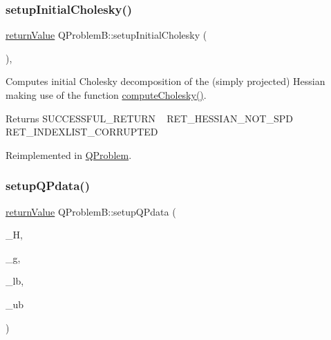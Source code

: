 \subsubsection{\texorpdfstring{setup\+Initial\+Cholesky()}{setupInitialCholesky()}}
{\footnotesize\ttfamily \hyperlink{_message_handling_8hpp_a81d556f613bfbabd0b1f9488c0fa865e}{return\+Value} Q\+Problem\+B\+::setup\+Initial\+Cholesky (\begin{DoxyParamCaption}{ }\end{DoxyParamCaption})\hspace{0.3cm}{\ttfamily [protected]}, {\ttfamily [virtual]}}

Computes initial Cholesky decomposition of the (simply projected) Hessian making use of the function \hyperlink{class_q_problem_b_a5f9fa59b80f990a897ba783e89dd03d3}{compute\+Cholesky()}. \begin{DoxyReturn}{Returns}
S\+U\+C\+C\+E\+S\+S\+F\+U\+L\+\_\+\+R\+E\+T\+U\+RN ~\newline
 R\+E\+T\+\_\+\+H\+E\+S\+S\+I\+A\+N\+\_\+\+N\+O\+T\+\_\+\+S\+PD ~\newline
 R\+E\+T\+\_\+\+I\+N\+D\+E\+X\+L\+I\+S\+T\+\_\+\+C\+O\+R\+R\+U\+P\+T\+ED 
\end{DoxyReturn}


Reimplemented in \hyperlink{class_q_problem_acb3d279975d00e5e459af3a7bb056658}{Q\+Problem}.

\mbox{\label{class_q_problem_b_ab785215eb0f10994203a19632b715212}} 
\subsubsection{\texorpdfstring{setup\+Q\+Pdata()}{setupQPdata()}\hspace{0.1cm}{\footnotesize\ttfamily [1/2]}}
{\footnotesize\ttfamily \hyperlink{_message_handling_8hpp_a81d556f613bfbabd0b1f9488c0fa865e}{return\+Value} Q\+Problem\+B\+::setup\+Q\+Pdata (\begin{DoxyParamCaption}\item[{\hyperlink{class_symmetric_matrix}{Symmetric\+Matrix} $\ast$}]{\+\_\+H,  }\item[{const \hyperlink{qp_o_a_s_e_s__wrapper_8h_a0d00e2b3dfadee81331bbb39068570c4}{real\+\_\+t} $\ast$const}]{\+\_\+g,  }\item[{const \hyperlink{qp_o_a_s_e_s__wrapper_8h_a0d00e2b3dfadee81331bbb39068570c4}{real\+\_\+t} $\ast$const}]{\+\_\+lb,  }\item[{const \hyperlink{qp_o_a_s_e_s__wrapper_8h_a0d00e2b3dfadee81331bbb39068570c4}{real\+\_\+t} $\ast$const}]{\+\_\+ub }\end{DoxyParamCaption})\hspace{0.3cm}{\ttfamily [protected]}}

